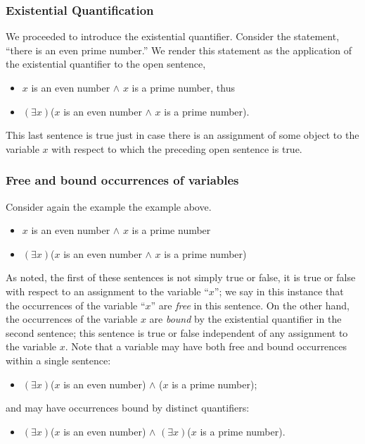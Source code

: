 \subsubsection{Existential Quantification}

We proceeded to introduce the existential quantifier. Consider the statement,
``there is an even prime number.''
We render this statement as the application of the existential quantifier to the open sentence,
\begin{itemize}
\item $x$ is an even number $\wedge$ $x$ is a prime number, thus
\item $(\exists x)$($x$ is an even number $\wedge$ $x$ is a prime number).
\end{itemize}
This last sentence is true just in case there is an assignment of some object to
the variable $x$ with respect to which the preceding open sentence is true.
\subsubsection{Free and bound occurrences of variables}

 Consider again the example the example above. 
\begin{itemize}
\item $x$ is an even number $\wedge$ $x$ is a prime number
\item $(\exists x)$($x$ is an even number $\wedge$ $x$ is a prime number)
\end{itemize}
As noted, the first of these sentences is not simply true or false, it is true or false with respect to an assignment to the variable ``$x$''; we say in this instance that the occurrences of the variable ``$x$'' are \emph{free} in this sentence. On the other hand, the occurrences of the variable $x$ are \emph{bound} by the existential quantifier in the second sentence; this sentence is true or false independent of any assignment to the variable $x$. Note that a variable may have both free and bound occurrences within a single sentence:
\begin{itemize}
\item $(\exists x)$($x$ is an even number) $\wedge$ ($x$ is a prime number); \end{itemize}
and may have occurrences bound by distinct quantifiers: 
\begin{itemize}
\item $(\exists x)$($x$ is an even number) $\wedge$ $(\exists x)$($x$ is a prime number).
\end{itemize}
